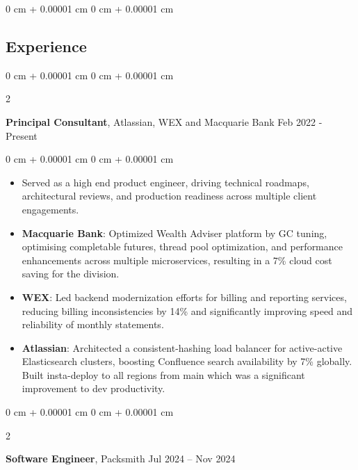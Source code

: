 \documentclass[10pt, letterpaper]{article}
\newenvironment{highlights}{
    \begin{itemize}[
        topsep=0.10 cm,
        parsep=0.10 cm,
        partopsep=0pt,
        itemsep=0pt,
        leftmargin=0 cm + 10pt
    ]
}{
    \end{itemize}
} %
\newenvironment{onecolentry}{
    \begin{adjustwidth}{
        0 cm + 0.00001 cm
    }{
        0 cm + 0.00001 cm
    }
}{
    \end{adjustwidth}
} %
\newenvironment{twocolentry}[2][]{
    \onecolentry
    \def\secondColumn{#2}
    \setcolumnwidth{\fill, 4.5 cm}
    \begin{paracol}{2}
}{
    \switchcolumn \raggedleft \secondColumn
    \end{paracol}
    \endonecolentry
} %
\begin{document}
\begin{onecolentry}
\begin{highlights}
    \section{Experience}
        \vspace{0.15 cm}
        \begin{twocolentry}{
            Feb 2022 - Present
        }
        \textbf{Principal Consultant}, Atlassian, WEX and Macquarie Bank\end{twocolentry}

        \vspace{0.10 cm}
        \begin{onecolentry}
            \begin{highlights}
                \item Served as a high end product engineer, driving technical roadmaps, architectural reviews, and production readiness across multiple client engagements.
                \item \textbf{Macquarie Bank}: Optimized Wealth Adviser platform by GC tuning, optimising completable futures, thread pool optimization, and performance enhancements across multiple microservices, resulting in a 7\% cloud cost saving for the division.

                \item \textbf{WEX}: Led backend modernization efforts for billing and reporting services, reducing billing inconsistencies by 14\% and significantly improving speed and reliability of monthly statements.
                \item \textbf{Atlassian}: Architected a consistent-hashing load balancer for active-active Elasticsearch clusters, boosting Confluence search availability by 7\% globally. Built insta-deploy to all regions from main which was a significant improvement to dev productivity.
            \end{highlights}
        \end{onecolentry}

        \vspace{0.15 cm}
        \begin{twocolentry}{
            Jul 2024 – Nov 2024
        }
            \textbf{Software Engineer}, Packsmith\end{twocolentry}


\end{highlights}
\end{onecolentry}
\end{document}
